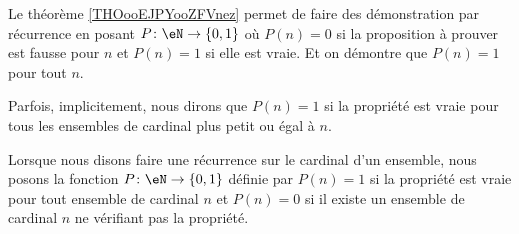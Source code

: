 \begin{normaltext}
	Le théorème \ref{THOooEJPYooZFVnez} permet de faire des démonstration par récurrence en posant \(P \colon \eN\to \{ 0,1 \}  \) où \( P(n)=0\) si la proposition à prouver est fausse pour \( n\) et \( P(n)=1\) si elle est vraie. Et on démontre que \( P(n)=1\) pour tout \( n\).

	Parfois, implicitement, nous dirons que \( P(n)=1\) si la propriété est vraie pour tous les ensembles de cardinal plus petit ou égal à \( n\).
\end{normaltext}

\begin{normaltext}		\label{NORMooPUOAooGnFjaX}

	Lorsque nous disons faire une récurrence sur le cardinal d'un ensemble, nous posons la fonction \(P \colon \eN\to \{ 0,1 \}  \) définie par \( P(n)=1\) si la propriété est vraie pour tout ensemble de cardinal \( n\) et \( P(n)=0\) si il existe un ensemble de cardinal \( n\) ne vérifiant pas la propriété.

\end{normaltext}


